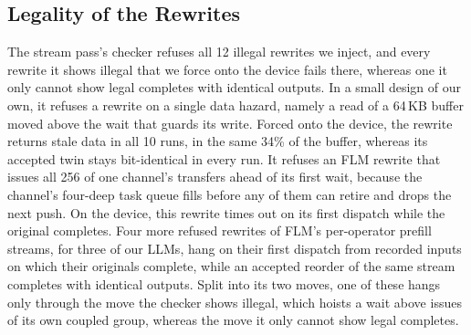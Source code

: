 \subsection{Legality of the Rewrites}
\label{subsec:legality-eval}

The stream pass's checker refuses all 12 illegal rewrites we inject, and every rewrite it shows illegal that we force onto the device fails there, whereas one it only cannot show legal completes with identical outputs.
In a small design of our own, it refuses a rewrite on a single data hazard, namely a read of a 64\,KB buffer moved above the wait that guards its write.
Forced onto the device, the rewrite returns stale data in all 10 runs, in the same 34\% of the buffer, whereas its accepted twin stays bit-identical in every run.
It refuses an FLM rewrite that issues all 256 of one channel's transfers ahead of its first wait, because the channel's four-deep task queue fills before any of them can retire and drops the next push.
On the device, this rewrite times out on its first dispatch while the original completes.
Four more refused rewrites of FLM's per-operator prefill streams, for three of our LLMs, hang on their first dispatch from recorded inputs on which their originals complete, while an accepted reorder of the same stream completes with identical outputs.
Split into its two moves, one of these hangs only through the move the checker shows illegal, which hoists a wait above issues of its own coupled group, whereas the move it only cannot show legal completes.
